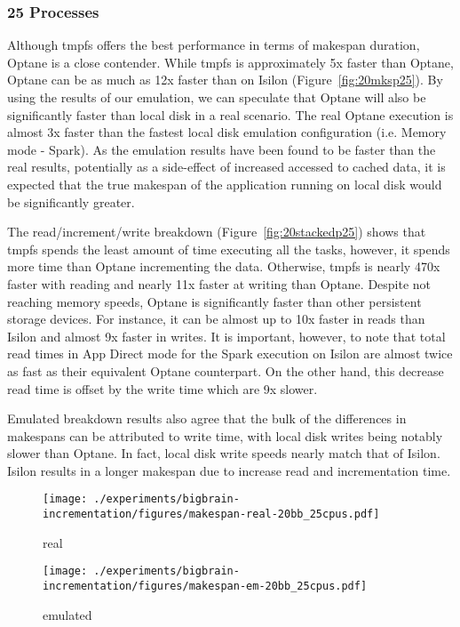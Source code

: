 \documentclass[conference]{IEEEtran}
\begin{document}
\subsubsection{25 Processes}

Although tmpfs offers the best performance in terms of makespan duration, Optane
is a close contender. While tmpfs is approximately 5x faster than Optane, Optane can be
as much as 12x faster than on Isilon (Figure~\ref{fig:20mksp25}). By using the results of 
our emulation, we can speculate that Optane will also be significantly faster than 
local disk in a real scenario. The real Optane execution is almost 3x faster than
the fastest local disk emulation configuration (i.e. Memory mode - Spark). As the
emulation results have been found to be faster than the real results, potentially as a side-effect
of increased accessed to cached data, it is expected
that the true makespan of the application running on local disk would be significantly
greater.

The read/increment/write breakdown (Figure~\ref{fig:20stackedp25}) shows that tmpfs
spends the least amount of time executing all the tasks, however, it spends more
time than Optane incrementing the data. Otherwise, tmpfs is nearly 470x faster with
reading and nearly 11x faster at writing than Optane. Despite not reaching memory
speeds, Optane is significantly faster than other persistent storage devices.
For instance, it can be almost up to 10x faster in reads than Isilon and almost 
9x faster in writes. It is important, however, to note that total read times in App
Direct mode for the Spark execution on Isilon are almost twice as fast as their 
equivalent Optane counterpart. On the other hand, this decrease read time is offset
by the write time which are 9x slower.

Emulated breakdown results also agree that the bulk of the differences in makespans
can be attributed to write time, with local disk writes being notably slower than
Optane. In fact, local disk write speeds nearly match that of Isilon. Isilon results
in a longer makespan due to increase read and incrementation time.
\begin{figure*}
    \begin{subfigure}{\columnwidth}
        \centering
    \texttt{[image: ./experiments/bigbrain-incrementation/figures/makespan-real-20bb\_25cpus.pdf]}
    \caption{real}
\end{subfigure}
\begin{subfigure}{\columnwidth}
        \centering
    \texttt{[image: ./experiments/bigbrain-incrementation/figures/makespan-em-20bb\_25cpus.pdf]}
    \caption{emulated}
\end{subfigure}
\caption{Makespan of the incrementation algorithm processing the 20~$\mu$m BigBrain using
25 processes}\label{fig:20mksp25}
\end{figure*}
\end{document}
